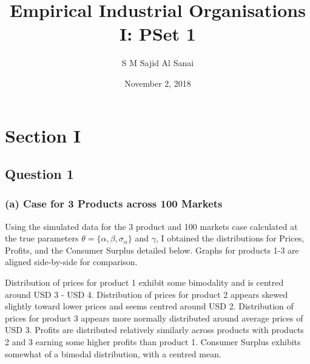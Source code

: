 \documentclass{article}
\title{Empirical Industrial Organisations I: PSet 1}
\author{S M Sajid Al Sanai}
\date{November 2, 2018}
\begin{document}
\maketitle
{}
\tableofcontents


\newpage
\section{Section I}
\subsection{Question 1}

\subsubsection{(a) Case for 3 Products across 100 Markets}
Using the simulated data for the 3 product and 100 markets case calculated at the true parameters $\theta=\{\alpha, \beta, \sigma_\alpha\}$ and $\gamma$, I obtained the distributions for Prices, Profits, and the Consumer Surplus detailed below. Graphs for products 1-3 are aligned side-by-side for comparison.
\par Distribution of prices for product 1 exhibit some bimodality and is centred around USD 3 - USD 4. Distribution of prices for product 2 appears skewed slightly toward lower prices and seems centred around USD 2. Distribution of prices for product 3 appears more normally distributed around average prices of USD 3. Profits are distributed relatively similarly across products with products 2 and 3 earning some higher profits than product 1. Consumer Surplus exhibits somewhat of a bimodal distribution, with a centred mean.
\end{document}
